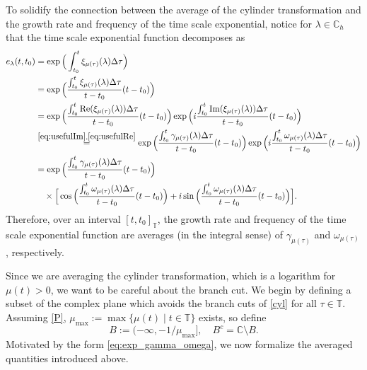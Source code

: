 \documentclass[reqno]{amsart}
\DeclareMathOperator{\myRe}{Re}
\DeclareMathOperator{\myIm}{Im}
\begin{document}
To solidify the connection between the average of the cylinder transformation and the
growth rate and frequency of the time scale exponential, notice for $\lambda \in \mathbb{C}_h$
that the time scale exponential function decomposes as
\begin{equation} \label{eq:exp_gamma_omega}
\begin{aligned}
 e_{\lambda}(t,t_0)
 &=  \exp\Big(\int_{t_0}^{t} \xi_{\mu(\tau)}(\lambda) \Delta \tau \Big) \\
 &= \exp\Big( \frac{\int_{t_0}^{t} \xi_{\mu(\tau)}(\lambda) \Delta \tau}
  {t-t_0} (t-t_0) \Big) \\
 &= \exp\Big( \frac{\int_{t_0}^{t} \myRe(\xi_{\mu(\tau)}(\lambda))
  \Delta \tau}{t-t_0} (t-t_0) \Big)
  \exp\Big( i \frac{\int_{t_0}^{t} \myIm(\xi_{\mu(\tau)}(\lambda)) \Delta \tau}{t-t_0}
   (t-t_0) \Big) \\
 &\overset{\eqref{eq:usefulIm},\eqref{eq:usefulRe}}{=}
 \exp\Big( \frac{\int_{t_0}^{t} \gamma_{\mu(\tau)}(\lambda) \Delta \tau}{t-t_0}
  (t-t_0) \Big)
  \exp\Big( i \frac{\int_{t_0}^{t} \omega_{\mu(\tau)}(\lambda) \Delta \tau}{t-t_0}
  (t-t_0) \Big) \\
 &=  \exp\Big( \frac{\int_{t_0}^{t} \gamma_{\mu(\tau)}(\lambda) \Delta \tau}{t-t_0}
  (t-t_0) \Big)   \\
 &\quad \times \Big[\cos\Big( \frac{\int_{t_0}^{t} \omega_{\mu(\tau)}(\lambda)
 \Delta \tau}{t-t_0} (t-t_0) \Big) + i \sin\Big( \frac{\int_{t_0}^{t}
 \omega_{\mu(\tau)}(\lambda) \Delta \tau}{t-t_0} (t-t_0) \Big) \Big].
 \end{aligned}
\end{equation}
Therefore, over an interval $[t,t_0]_{\mathbb{T}}$, the growth rate and frequency of the
time scale exponential function are averages (in the integral sense) of
$\gamma_{\mu(\tau)}$ and $\omega_{\mu(\tau)}$, respectively.

Since we are averaging the cylinder transformation, which is a logarithm for
$\mu(t)>0$, we want to be careful about the branch cut. We begin by defining a subset
of the complex plane which avoids the branch cuts of \eqref{cyl} for all $\tau\in\mathbb{T}$.
Assuming \eqref{P}, $\mu_{\max}:=\max \{ \mu(t) \mid t \in \mathbb{T} \}$ exists, so define
\[
 B:= (-\infty, -1/\mu_{\max}],\quad
 B^c= \mathbb{C} \setminus B.
\]
Motivated by the form \eqref{eq:exp_gamma_omega}, we now formalize the averaged
quantities introduced above.
\end{document}
